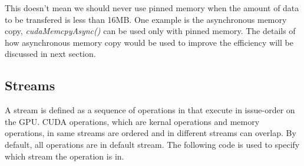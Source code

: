 \documentclass[journal,12pt,onecolumn,draftclsnofoot]{ieeeconf}  %
\begin{document}
This doesn't mean we should never use pinned memory when the amount of data to be transfered is less than 16MB. One example is the asynchronous memory copy, \textit{cudaMemcpyAsync()} can be used only with pinned memory. The details of how asynchronous memory copy would be used to improve the efficiency will be discussed in next section.

\subsection{Streams}
A stream is defined as a sequence of operations in that execute in issue-order on the GPU. CUDA operations, which are kernal operations and memory operations, in same streams are ordered and in different streams can overlap. By default, all operations are in default stream. The following code is used to specify which stream the operation is in. \par
\end{document}
